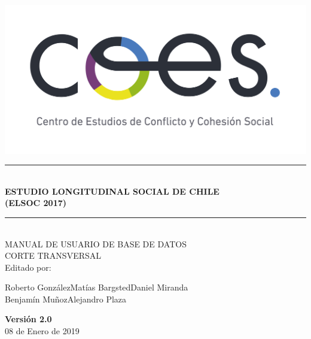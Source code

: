 \documentclass[12pt]{report}
\newcommand{\HRule}[1]{\rule{\linewidth}{#1}}
\begin{document}

\begin{titlepage}
	\centering
	\includegraphics[width=16cm]{coes_blanco_esp}

\HRule{1.4pt} \\
\LARGE \textbf{\uppercase{Estudio Longitudinal Social de Chile}}\\
\LARGE \textbf{\uppercase{(ELSOC 2017)}}\\

\HRule{1.4pt} \\ [0.2cm]

\normalsize  \vspace*{0.2\baselineskip}
 \large \textsc{MANUAL DE USUARIO DE BASE DE DATOS\\ 	CORTE TRANSVERSAL}
\\ [0.2cm]
\vspace*{0.9cm}
Editado por:\\
\begin{center}
Roberto González\hspace*{1.25cm}Matías Bargsted\hspace*{1.25cm}Daniel Miranda\\
Benjamín Muñoz\hspace*{1.5cm}Alejandro Plaza\\
\end{center}
\vspace*{1.3cm}
\textbf{Versión 2.0}\\
08 de Enero de  2019\\
\end{titlepage}


\tableofcontents
\newpage

\listoffigures
\listoftables
\newpage

	\sectionfont{\scshape}
\end{document}
